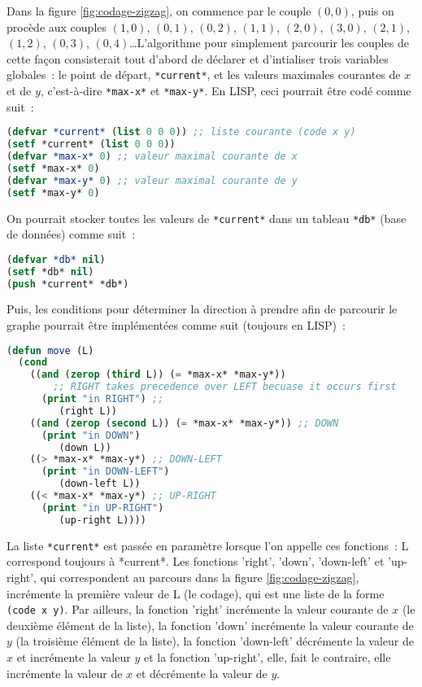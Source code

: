 \documentclass{article}
\begin{document}

Dans la figure \ref{fig:codage-zigzag}, on commence par le couple $(0,0)$, puis on procède aux couples $(1,0)$, $(0,1)$, $(0,2)$, $(1,1)$, $(2,0)$, $(3,0)$, $(2,1)$, $(1,2)$, $(0,3)$, $(0,4)$\ldots L'algorithme pour simplement parcourir les couples de cette façon consisterait tout d'abord de déclarer et d'intialiser trois variables globales~: le point de départ, \lstinline!*current*!, et les valeurs maximales courantes de $x$ et de $y$, c'est-à-dire \lstinline!*max-x*! et \lstinline!*max-y*!. En LISP, ceci pourrait être codé comme suit~:

\begin{lstlisting}[language=Lisp]
(defvar *current* (list 0 0 0)) ;; liste courante (code x y)
(setf *current* (list 0 0 0)) 
(defvar *max-x* 0) ;; valeur maximal courante de x
(setf *max-x* 0)
(defvar *max-y* 0) ;; valeur maximal courante de y
(setf *max-y* 0)
\end{lstlisting}

On pourrait stocker toutes les valeurs de \lstinline!*current*! dans un tableau \lstinline!*db*! (base de données) comme suit~:

\begin{lstlisting}[language=Lisp]
(defvar *db* nil) 
(setf *db* nil)
(push *current* *db*)
\end{lstlisting}

Puis, les conditions pour déterminer la direction à prendre afin de parcourir le graphe pourrait être implémentées comme suit (toujours en LISP)~:

\begin{lstlisting}[language=Lisp]
(defun move (L)
  (cond
    ((and (zerop (third L)) (= *max-x* *max-y*)) 
		;; RIGHT takes precedence over LEFT becuase it occurs first
      (print "in RIGHT") ;; 
         (right L))
    ((and (zerop (second L)) (= *max-x* *max-y*)) ;; DOWN
      (print "in DOWN") 
         (down L))
    ((> *max-x* *max-y*) ;; DOWN-LEFT
      (print "in DOWN-LEFT")  
         (down-left L))
    ((< *max-x* *max-y*) ;; UP-RIGHT
      (print "in UP-RIGHT") 
         (up-right L))))
\end{lstlisting}
 
La liste \lstinline!*current*! est passée en paramètre lorsque l'on appelle ces fonctions~: L correspond toujours à *current*. Les fonctions 'right', 'down', 'down-left' et 'up-right', qui correspondent au parcours dans la figure \ref{fig:codage-zigzag}, incrémente la première valeur de L (le codage), qui est une liste de la forme \lstinline!(code x y)!. Par ailleurs, la fonction 'right' incrémente la valeur courante de $x$ (le deuxième élément de la liste), la fonction 'down' incrémente la valeur courante de $y$ (la troisième élément de la liste), la fonction 'down-left' décrémente la valeur de $x$ et incrémente la valeur $y$ et la fonction 'up-right', elle, fait le contraire, elle incrémente la valeur de $x$ et décrémente la valeur de $y$. 
\end{document}
